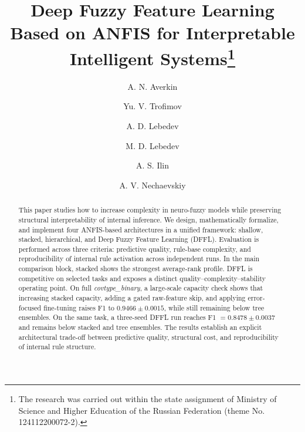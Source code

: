 \documentclass[runningheads]{llncs}
\begin{document}
\title{Deep Fuzzy Feature Learning Based on ANFIS for Interpretable Intelligent Systems\thanks{The research was carried out within the state assignment of Ministry of Science and Higher Education of the Russian Federation (theme No. 124112200072-2).}}

\author{
    A. N. Averkin \and
    Yu. V. Trofimov \and
    A. D. Lebedev \and
    M. D. Lebedev \and
    A. S. Ilin \and
    A. V. Nechaevskiy
}



\maketitle

\begin{abstract}
This paper studies how to increase complexity in neuro-fuzzy models while preserving structural interpretability of internal inference. We design, mathematically formalize, and implement four ANFIS-based architectures in a unified framework: shallow, stacked, hierarchical, and Deep Fuzzy Feature Learning (DFFL). Evaluation is performed across three criteria: predictive quality, rule-base complexity, and reproducibility of internal rule activation across independent runs. In the main comparison block, stacked shows the strongest average-rank profile. DFFL is competitive on selected tasks and exposes a distinct quality--complexity--stability operating point. On full \textit{covtype\_binary}, a large-scale capacity check shows that increasing stacked capacity, adding a gated raw-feature skip, and applying error-focused fine-tuning raises F1 to $0.9466\pm0.0015$, while still remaining below tree ensembles. On the same task, a three-seed DFFL run reaches F1 $=0.8478\pm0.0037$ and remains below stacked and tree ensembles. The results establish an explicit architectural trade-off between predictive quality, structural cost, and reproducibility of internal rule structure.
\end{abstract}
\end{document}
